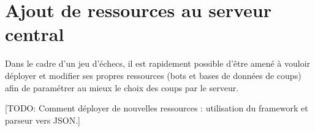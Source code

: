 \documentclass[a4paper,11pt]{report}
\begin{document}
\chapter{Ajout de ressources au serveur central}
         Dans le cadre d'un jeu d'échecs, il est rapidement possible d’être amené à vouloir déployer et modifier ses propres ressources (bots et bases de données de coups) afin de paramétrer au mieux le choix des coups par le serveur.
        
[TODO: Comment déployer de nouvelles ressources : utilisation du framework et parseur vers JSON.]
        
        
\end{document}
